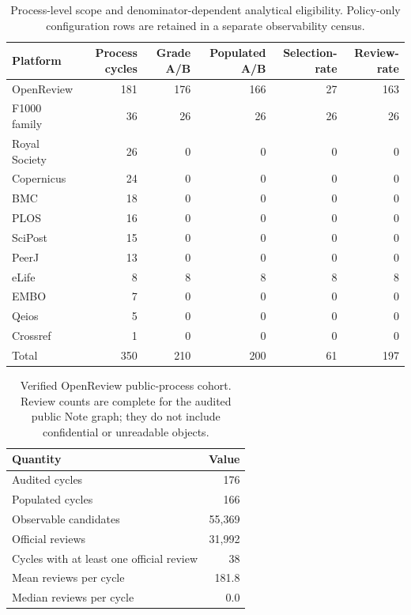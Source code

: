 \begin{table}[H]
\centering
\caption{Process-level scope and denominator-dependent analytical eligibility. Policy-only configuration rows are retained in a separate observability census.}
\label{tab:descriptive-summary}
\small
\begin{tabular}{lrrrrr}
\toprule
Platform & Process cycles & Grade A/B & Populated A/B & Selection-rate & Review-rate \\
\midrule
OpenReview & 181 & 176 & 166 & 27 & 163 \\
F1000 family & 36 & 26 & 26 & 26 & 26 \\
Royal Society & 26 & 0 & 0 & 0 & 0 \\
Copernicus & 24 & 0 & 0 & 0 & 0 \\
BMC & 18 & 0 & 0 & 0 & 0 \\
PLOS & 16 & 0 & 0 & 0 & 0 \\
SciPost & 15 & 0 & 0 & 0 & 0 \\
PeerJ & 13 & 0 & 0 & 0 & 0 \\
eLife & 8 & 8 & 8 & 8 & 8 \\
EMBO & 7 & 0 & 0 & 0 & 0 \\
Qeios & 5 & 0 & 0 & 0 & 0 \\
Crossref & 1 & 0 & 0 & 0 & 0 \\
\midrule
Total & 350 & 210 & 200 & 61 & 197 \\ 
\bottomrule
\end{tabular}
\end{table}

\begin{table}[H]
\centering
\caption{Verified OpenReview public-process cohort. Review counts are complete for the audited public Note graph; they do not include confidential or unreadable objects.}
\label{tab:openreview-summary}
\small
\begin{tabular}{lr}
\toprule
Quantity & Value \\
\midrule
Audited cycles & 176 \\ 
Populated cycles & 166 \\ 
Observable candidates & 55,369 \\ 
Official reviews & 31,992 \\ 
Cycles with at least one official review & 38 \\ 
Mean reviews per cycle & 181.8 \\ 
Median reviews per cycle & 0.0 \\ 
\bottomrule
\end{tabular}
\end{table}
